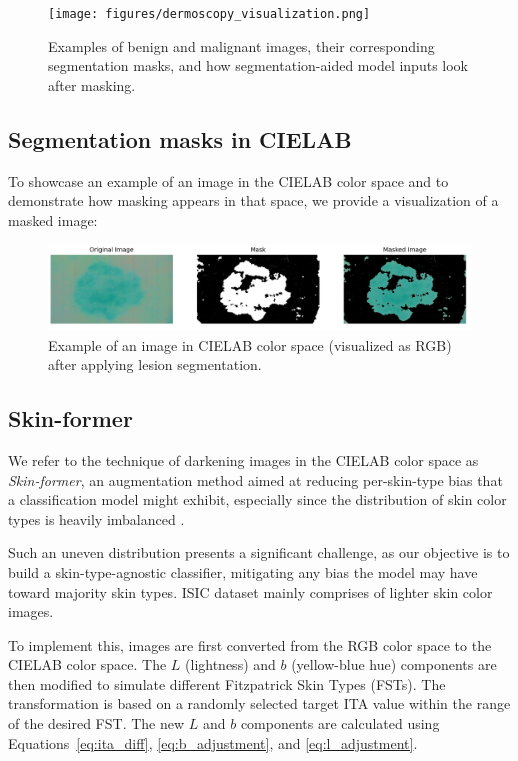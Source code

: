 \vspace{1em}
\begin{figure}[htbp]
\centering
\texttt{[image: figures/dermoscopy\_visualization.png]}
\caption{Examples of benign and malignant images, their corresponding segmentation masks, and how segmentation-aided model inputs look after masking.}
\label{fig:segmentation-aided-inputs}
\end{figure}

\subsection{Segmentation masks in CIELAB}

To showcase an example of an image in the CIELAB color space and to demonstrate how masking appears in that space, we provide a visualization of a masked image:

\vspace{1em}
\begin{figure}[htbp]
\centering
\includegraphics[width=\linewidth]{figures/cielab_masked_image.jpeg}
\caption{Example of an image in CIELAB color space (visualized as RGB) after applying lesion segmentation.}
\label{fig:segmentation-cieelab}
\end{figure}


\subsection{Skin-former}

We refer to the technique of darkening images in the CIELAB color space as \textit{Skin-former}, an augmentation method aimed at reducing per-skin-type bias that a classification model might exhibit, especially since the distribution of skin color types is heavily imbalanced \cite{skin_color_debiasing}.

Such an uneven distribution presents a significant challenge, as our objective is to build a skin-type-agnostic classifier, mitigating any bias the model may have toward majority skin types. ISIC dataset mainly comprises of lighter skin color images.

To implement this, images are first converted from the RGB color space to the CIELAB color space. The \( L \) (lightness) and \( b \) (yellow-blue hue) components are then modified to simulate different Fitzpatrick Skin Types (FSTs). The transformation is based on a randomly selected target ITA value within the range of the desired FST. The new \( L \) and \( b \) components are calculated using Equations~\ref{eq:ita_diff}, \ref{eq:b_adjustment}, and \ref{eq:l_adjustment}.

